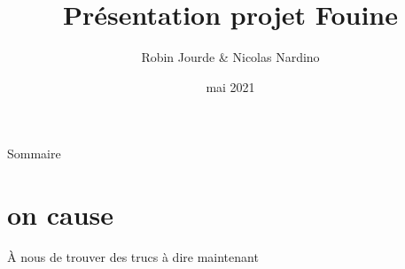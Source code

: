 \documentclass{beamer}
\title{Présentation projet Fouine}
\author{Robin Jourde \& Nicolas Nardino}
\date{mai 2021}
\begin{document}
\begin{frame}
  \titlepage
\end{frame}


\begin{frame}
  \begin{center}
    \tiny
    
  \end{center}
\end{frame}


\begin{frame}{Sommaire}
  \tableofcontents
\end{frame}


\section{on cause}
\begin{frame}{À nous de trouver des trucs à dire maintenant}


\end{frame}
\end{document}

